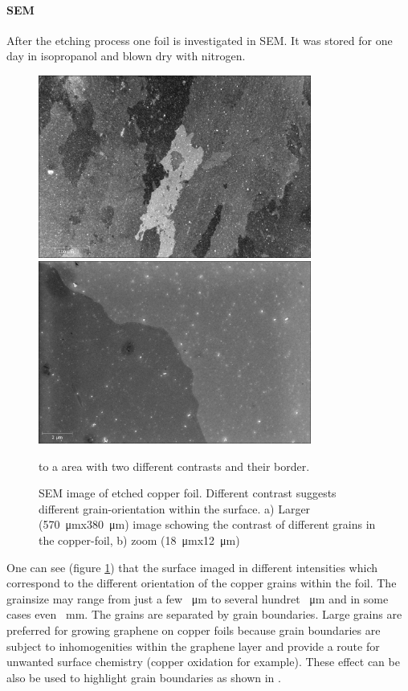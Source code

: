 \paragraph{SEM}
After the etching process one foil is investigated in SEM. It was stored for one day in isopropanol and blown dry with nitrogen. 



\begin{figure}[]
	\begin{center}
		\includegraphics[height=6cm]{./images/Domenik_16031715.jpg}
		\includegraphics[height=6cm]{./images/Domenik_16031717.jpg}
	\end{center}
	\caption{SEM image of etched copper foil. Different contrast suggests different grain-orientation within the surface. a) Larger (\SI{570}{\micro \meter}x\SI{380}{\micro \meter}) image schowing the contrast of different grains in the copper-foil, b) zoom (\SI{18}{\micro \meter}x\SI{12}{\micro \meter})} to a area with two different contrasts and their border.
	\label{SEM-gb}
\end{figure}

One can see (figure \ref{SEM-gb}) that the surface imaged in different intensities which correspond to the different orientation of the copper grains within the foil\cite{wu_effects_2015}. The grainsize may range from just a few \SI{}{\micro \meter} to several hundret \SI{}{\micro \meter} and in some cases even \SI{}{\milli \meter}. The grains are separated by grain boundaries. Large grains are preferred for growing graphene on copper foils because grain boundaries are subject to inhomogenities within the graphene layer and provide a route for unwanted surface chemistry (copper oxidation for example). These effect can be also be used to highlight grain boundaries as shown in \cite{wu_effects_2015}.

